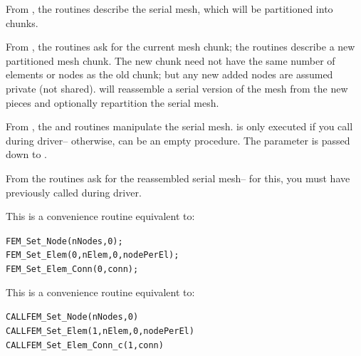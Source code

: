 \documentclass[10pt]{article}
\begin{document}
From , the  routines describe the serial mesh, which
will be partitioned into chunks.

From , the  routines ask for the current mesh
chunk; the  routines describe a new partitioned mesh chunk.  The
new chunk need not have the same number of elements or nodes as the old chunk;
but any new added nodes are assumed private (not shared).
 will reassemble a serial version of the mesh from the
new pieces and optionally repartition the serial mesh.

From , the  and  routines
manipulate the serial mesh.    is only executed if you call
 during driver-- otherwise,  can be an
empty procedure.  The parameter  is passed down to
.

From  the  routines ask for the reassembled
serial mesh-- for this, you must have previously called 
during driver.


     This is a convenience routine equivalent to:
\begin{alltt}
          FEM\_Set\_Node(nNodes,0);
          FEM\_Set\_Elem(0,nElem,0,nodePerEl);
          FEM\_Set\_Elem\_Conn(0,conn);
\end{alltt}


     This is a convenience routine equivalent to:
\begin{alltt}
          CALL FEM\_Set\_Node(nNodes,0)
          CALL FEM\_Set\_Elem(1,nElem,0,nodePerEl)
          CALL FEM\_Set\_Elem\_Conn\_c(1,conn)
\end{alltt}

\end{document}
